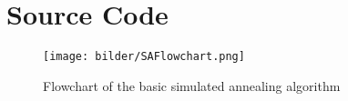 \chapter{Source Code}



\begin{figure}
\texttt{[image: bilder/SAFlowchart.png]}
\caption{Flowchart of the basic simulated annealing algorithm}
\label{fig:SAFlowchart}
\end{figure}